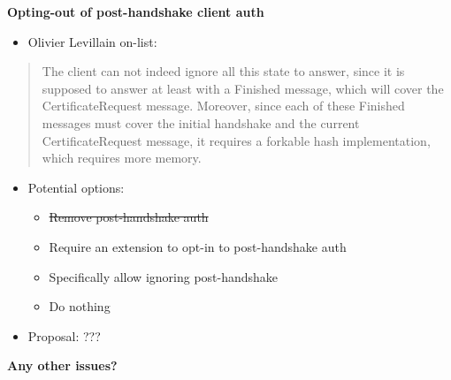 \documentclass[helvetica]{seminar}
\newcommand{\heading}[1]{%
  \begin{center} 
    \large\bf 
    #1 
  \end{center} 
  \vspace{.4 in}}
\begin{document}
\begin{slide}
\heading{Opting-out of post-handshake client auth}

\vspace{-2ex}
\begin{itemize}
\item Olivier Levillain on-list:
\end{itemize}

{\footnotesize
\begin{quote}
The client can not indeed ignore all this state to answer, since it
is supposed to answer at least with a Finished message, which will cover
the CertificateRequest message. Moreover, since each of these Finished
messages must cover the initial handshake and the current
CertificateRequest message, it requires a forkable hash implementation,
which requires more memory.
\end{quote}
}

\begin{itemize}
\item Potential options:
  \begin{itemize}
  \item \sout{Remove post-handshake auth}
  \item Require an extension to opt-in to post-handshake auth
  \item Specifically allow ignoring post-handshake
  \item Do nothing
  \end{itemize}

\item Proposal: ???
\end{itemize}
\end{slide}


\begin{slide}
\heading{Any other issues?}

\end{slide}
\end{document}
